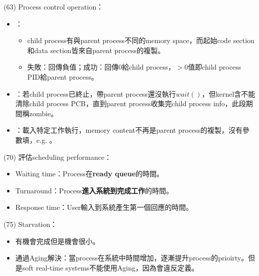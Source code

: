 \begin{theorem}{(63)} Process control operation： \begin{itemize}
        \item {}：\begin{itemize}
            \item child process有與parent process不同的memory space，而起始code section和data section皆來自parent process的複製。
            \item 失敗：回傳負值；成功：回傳$0$給child process，$> 0$值即child process PID給parent process。
        \end{itemize}
        \item {}：若child process已終止，帶parent process還沒執行$wait()$，但kernel含不能清除child process PCB，直到parent process收集完child process info，此段期間稱zombie。
        \item {}：載入特定工作執行，memory content不再是parent process的複製，沒有參數填，e.g. 。
    \end{itemize}
\end{theorem}

\begin{theorem}{(70)} 評估scheduling performance： \begin{itemize}
        \item Waiting time：Process在\textbf{ready queue}的時間。
        \item Turnaround：Process\textbf{進入系統到完成工作}的時間。
        \item Response time：User輸入到系統產生第一個回應的時間。
    \end{itemize}
\end{theorem}

\begin{theorem}{(75)} Starvation：\begin{itemize}
        \item 有機會完成但是機會很小。
        \item 通過Aging解決：當process在系統中時間增加，逐漸提升process的prioirty。但是soft real-time systems不能使用Aging，因為會違反定義。
    \end{itemize}
\end{theorem}

